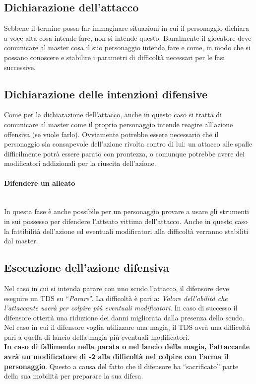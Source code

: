 \documentclass[../manuale_main.tex]{subfiles}
\begin{document}
\subsection{Dichiarazione dell'attacco}
Sebbene il termine possa far immaginare situazioni in cui il personaggio dichiara a voce alta cosa intende fare, non si intende questo.
Banalmente il giocatore deve comunicare al master cosa il suo personaggio intenda fare e come, in modo che si possano conoscere e stabilire i parametri di difficoltà necessari per le fasi successive. 

\subsection{Dichiarazione delle intenzioni difensive}
Come per la dichiarazione dell'attacco, anche in questo caso si tratta di comunicare al master come il proprio personaggio intende reagire all'azione offensiva (se vuole farlo). Ovviamente potrebbe essere necessario che il personaggio sia consapevole dell'azione rivolta contro di lui: un attacco alle spalle difficilmente potrà essere parato con prontezza, o comunque potrebbe avere dei modificatori addizionali per la riuscita dell'azione.
\paragraph{Difendere un alleato}\mbox{}\\
In questa fase è anche possibile per un personaggio provare a usare gli strumenti in sui possesso per difendere l'atteato vittima dell'attacco. Anche in questo caso la fattibilità dell'azione ed eventuali modificatori alla difficoltà verranno stabiliti dal master.

\subsection{Esecuzione dell'azione difensiva}
Nel caso in cui si intenda parare con uno scudo l'attacco, il difensore deve eseguire un TDS su ``\emph{Parare}''. La difficoltà è pari a: \emph{Valore dell'abilità che l'attaccante userà per colpire più eventuali modificatori}. In caso di successo il difensore otterrà una riduzione dei danni migliorata dalla presenza dello scudo.\\
Nel caso in cui il difensore voglia utilizzare una magia, il TDS avrà una difficoltà pari a quella di lancio della magia più eventuali modificatori.\\
\textbf{In caso di fallimento nella parata o nel lancio della magia, l'attaccante avrà un modificatore di -2 alla difficoltà nel colpire con l'arma il personaggio}. Questo a causa del fatto che il difensore ha ``sacrificato''  parte della sua mobilità per preparare la sua difesa.
\end{document}
